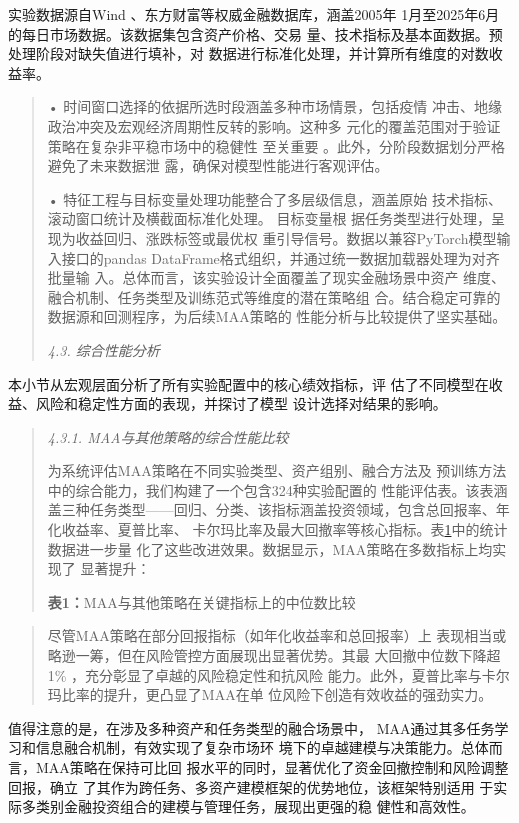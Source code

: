 实验数据源自Wind 、东方财富等权威金融数据库，涵盖2005年
1月至2025年6月的每日市场数据。该数据集包含资产价格、交易
量、技术指标及基本面数据。预处理阶段对缺失值进行填补，对
数据进行标准化处理，并计算所有维度的对数收益率。

\begin{quote}
• 时间窗口选择的依据所选时段涵盖多种市场情景，包括疫情
冲击、地缘政治冲突及宏观经济周期性反转的影响。这种多
元化的覆盖范围对于验证策略在复杂非平稳市场中的稳健性 至关重要
。此外，分阶段数据划分严格避免了未来数据泄
露，确保对模型性能进行客观评估。

• 特征工程与目标变量处理功能整合了多层级信息，涵盖原始
技术指标、滚动窗口统计及横截面标准化处理。 目标变量根
据任务类型进行处理，呈现为收益回归、涨跌标签或最优权
重引导信号。数据以兼容PyTorch模型输入接口的pandas
DataFrame格式组织，并通过统一数据加载器处理为对齐批量输
入。总体而言，该实验设计全面覆盖了现实金融场景中资产
维度、融合机制、任务类型及训练范式等维度的潜在策略组
合。结合稳定可靠的数据源和回测程序，为后续MAA策略的
性能分析与比较提供了坚实基础。

\emph{4.3. 综合性能分析}
\end{quote}

本小节从宏观层面分析了所有实验配置中的核心绩效指标，评
估了不同模型在收益、风险和稳定性方面的表现，并探讨了模型
设计选择对结果的影响。

\begin{quote}
\emph{4.3.1. MAA与其他策略的综合性能比较}

为系统评估MAA策略在不同实验类型、资产组别、融合方法及
预训练方法中的综合能力，我们构建了一个包含324种实验配置的
性能评估表。该表涵盖三种任务类型------回归、分类、该指标涵盖投资领域，包含总回报率、年化收益率、夏普比率、
卡尔玛比率及最大回撤率等核心指标。表\hyperref[bookmark46]{1}中的统计数据进一步量
化了这些改进效果。数据显示，MAA策略在多数指标上均实现了 显著提升：

\textbf{表1：}MAA与其他策略在关键指标上的中位数比较
\end{quote}

\begin{quote}
尽管MAA策略在部分回报指标（如年化收益率和总回报率）上
表现相当或略逊一筹，但在风险管控方面展现出显著优势。其最
大回撤中位数下降超1\% ，充分彰显了卓越的风险稳定性和抗风险
能力。此外，夏普比率与卡尔玛比率的提升，更凸显了MAA在单
位风险下创造有效收益的强劲实力。
\end{quote}

值得注意的是，在涉及多种资产和任务类型的融合场景中，
MAA通过其多任务学习和信息融合机制，有效实现了复杂市场环
境下的卓越建模与决策能力。总体而言，MAA策略在保持可比回
报水平的同时，显著优化了资金回撤控制和风险调整回报，确立
了其作为跨任务、多资产建模框架的优势地位，该框架特别适用
于实际多类别金融投资组合的建模与管理任务，展现出更强的稳 健性和高效性。


